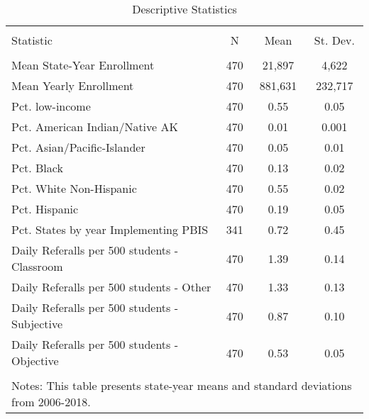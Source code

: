 
\begin{table}[!htbp] \centering 
  \caption{Descriptive Statistics} 
  \label{} 
\begin{tabular}{@{\extracolsep{5pt}}lccc} 
\\[-1.8ex]\hline 
\hline \\[-1.8ex] 
Statistic & \multicolumn{1}{c}{N} & \multicolumn{1}{c}{Mean} & \multicolumn{1}{c}{St. Dev.} \\ 
\hline \\[-1.8ex] 
Mean State-Year Enrollment & 470 & 21,897 & 4,622 \\ 
Mean Yearly Enrollment & 470 & 881,631 & 232,717 \\ 
Pct. low-income & 470 & 0.55 & 0.05 \\ 
Pct. American Indian/Native AK & 470 & 0.01 & 0.001 \\ 
Pct. Asian/Pacific-Islander & 470 & 0.05 & 0.01 \\ 
Pct. Black & 470 & 0.13 & 0.02 \\ 
Pct. White Non-Hispanic & 470 & 0.55 & 0.02 \\ 
Pct. Hispanic & 470 & 0.19 & 0.05 \\ 
Pct. States by year Implementing PBIS & 341 & 0.72 & 0.45 \\ 
Daily Referalls per 500 students - Classroom & 470 & 1.39 & 0.14 \\ 
Daily Referalls per 500 students - Other & 470 & 1.33 & 0.13 \\ 
Daily Referalls per 500 students - Subjective & 470 & 0.87 & 0.10 \\ 
Daily Referalls per 500 students - Objective & 470 & 0.53 & 0.05 \\ 
\hline \\[-1.8ex] 
\multicolumn{4}{l}{Notes: This table presents state-year means and standard deviations from 2006-2018.} \\ 
\end{tabular} 
\end{table} 
